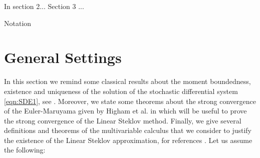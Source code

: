 \documentclass[sort&compress, preprint]{elsarticle}
\theoremstyle{definition}
\newtheorem{hypothesis}{Hypothesis}[section]
\theoremstyle{plain}%
\theoremstyle{remark}
\newcommand{\innerprod}[2]{\left\langle#1, #2\right\rangle}
\begin{document}
In section 2... Section 3 ...

Notation

\section{General Settings} 

In this section we remind some classical results  about the moment boundedness, existence 
and uniqueness of the solution of the stochastic differential system \eqref{eqn:SDE1}, 
see \cite{Higham2002b,Mao2013,Mao2007}. Moreover, we state some theorems about the strong 
convergence of the Euler-Maruyama given by Higham et al. in \cite{Higham2002b} which will be useful 
to prove the strong convergence of the Linear Steklov method. Finally, 
we give several definitions and theorems of the multivariable calculus 
that we consider to justify the existence of the Linear Steklov approximation, 
 for references \cite{Lawlor2012,FineAIandKass1966}. Let us assume
the following:


	
\end{document}
